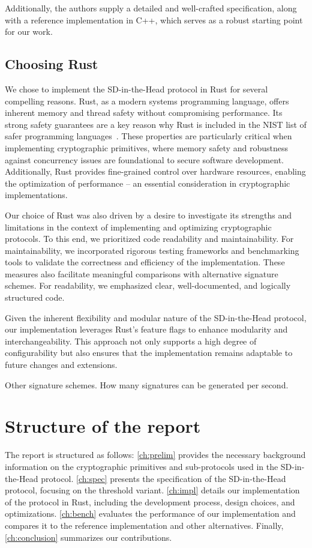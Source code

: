 \documentclass[twoside,11pt]{report}
\theoremstyle{definition}
\theoremstyle{plain}
\begin{document}
Additionally, the authors supply a detailed and well-crafted specification, along with a reference implementation in C++, which serves as a robust starting point for our work.


\subsection{Choosing Rust}
We chose to implement the SD-in-the-Head protocol in Rust for several compelling reasons. Rust, as a modern systems programming language, offers inherent memory and thread safety without compromising performance. Its strong safety guarantees are a key reason why Rust is included in the NIST list of safer programming languages~\cite{nistsaferlanguages}. These properties are particularly critical when implementing cryptographic primitives, where memory safety and robustness against concurrency issues are foundational to secure software development. Additionally, Rust provides fine-grained control over hardware resources, enabling the optimization of performance -- an essential consideration in cryptographic implementations.

Our choice of Rust was also driven by a desire to investigate its strengths and limitations in the context of implementing and optimizing cryptographic protocols. To this end, we prioritized code readability and maintainability. For maintainability, we incorporated rigorous testing frameworks and benchmarking tools to validate the correctness and efficiency of the implementation. These measures also facilitate meaningful comparisons with alternative signature schemes. For readability, we emphasized clear, well-documented, and logically structured code.

Given the inherent flexibility and modular nature of the SD-in-the-Head protocol, our implementation leverages Rust's feature flags to enhance modularity and interchangeability. This approach not only supports a high degree of configurability but also ensures that the implementation remains adaptable to future changes and extensions.

Other signature schemes. How many signatures can be generated per second.

\section{Structure of the report}
The report is structured as follows: \autoref{ch:prelim} provides the necessary background information on the cryptographic primitives and sub-protocols used in the SD-in-the-Head protocol. \autoref{ch:spec} presents the specification of the SD-in-the-Head protocol, focusing on the threshold variant. \autoref{ch:impl} details our implementation of the protocol in Rust, including the development process, design choices, and optimizations. \autoref{ch:bench} evaluates the performance of our implementation and compares it to the reference implementation and other alternatives. Finally, \autoref{ch:conclusion} summarizes our contributions.
\end{document}
